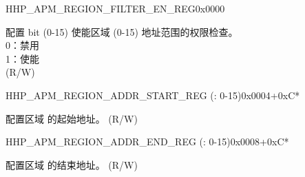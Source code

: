 \begin{register}{H}{HP\_APM\_REGION\_FILTER\_EN\_REG}{0x0000}\label{regdesc:HPAPMREGIONFILTERENREG}
%
%
\regnewline%
\begin{regdesc}\begin{reglist}
\label{fielddesc:HPAPMREGIONFILTEREN}\item [HP\_APM\_REGION\_FILTER\_EN] 配置 bit  (0-15) 使能区域  (0-15) 地址范围的权限检查。\\
    0：禁用 \\
    1：使能  \\ (R/W)
\end{reglist}\end{regdesc}
\end{register}


\begin{register}{H}{HP\_APM\_REGION\_ADDR\_START\_REG (: 0-15)}{0x0004+0xC*}\label{regdesc:HPAPMREGIONNADDRSTARTREG}
%
\regnewline%
\begin{regdesc}\begin{reglist}
\label{fielddesc:HPAPMREGIONNADDRSTART}\item [HP\_APM\_REGION\regindex{n}\_ADDR\_START] 配置区域  的起始地址。 (R/W)
\end{reglist}\end{regdesc}
\end{register}


\begin{register}{H}{HP\_APM\_REGION\_ADDR\_END\_REG (: 0-15)}{0x0008+0xC*}\label{regdesc:HPAPMREGIONNADDRENDREG}
%
\regnewline%
\begin{regdesc}\begin{reglist}
\label{fielddesc:HPAPMREGIONNADDREND}\item [HP\_APM\_REGION\regindex{n}\_ADDR\_END] 配置区域  的结束地址。 (R/W)
\end{reglist}\end{regdesc}
\end{register}


